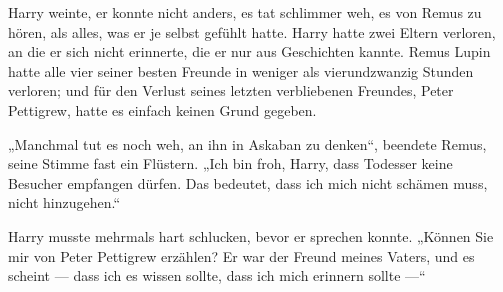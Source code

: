 Harry weinte, er konnte nicht anders, es tat schlimmer weh, es von Remus zu hören, als alles, was er je selbst gefühlt hatte. Harry hatte zwei Eltern verloren, an die er sich nicht erinnerte, die er nur aus Geschichten kannte. Remus Lupin hatte alle vier seiner besten Freunde in weniger als vierundzwanzig Stunden verloren; und für den Verlust seines letzten verbliebenen Freundes, Peter Pettigrew, hatte es einfach keinen Grund gegeben.

„Manchmal tut es noch weh, an ihn in Askaban zu denken“, beendete Remus, seine Stimme fast ein Flüstern.
„Ich bin froh, Harry, dass Todesser keine Besucher empfangen dürfen. Das bedeutet, dass ich mich nicht schämen muss, nicht hinzugehen.“

Harry musste mehrmals hart schlucken, bevor er sprechen konnte.
„Können Sie mir von Peter Pettigrew erzählen? Er war der Freund meines Vaters, und es scheint — dass ich es wissen sollte, dass ich mich erinnern sollte —“


